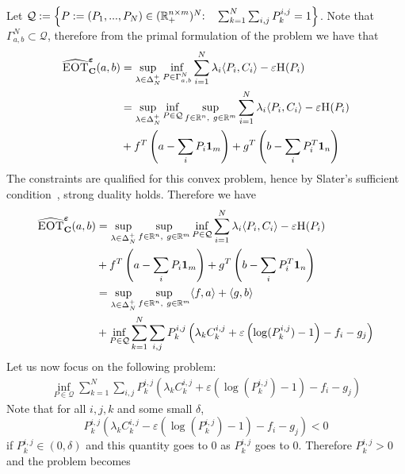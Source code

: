 \begin{prv*}
Let $\mathcal{Q}:=\left\{P:=(P_1,...,P_N)\in(\mathbb{R}_{+}^{n\times m})^N \text{:\quad} \sum_{k=1}^N \sum_{i,j} P_k^{i,j}=1 \right\}$. Note that $\Gamma_{a,b}^N\subset \mathcal{Q}$, therefore from the primal formulation of the problem we have that 
\begin{align*}
    \widehat{\textsc{EOT}}^{\bm{\varepsilon}}_{\mathbf{C}}(a,b)&=\sup_{\lambda\in\Delta_N^{+}}\inf_{P\in \Gamma_{a,b}^N}  \sum_{i=1}^N \lambda_i \langle P_i,C_i\rangle -\varepsilon \textsc{H}(P_i) \\
   &= \sup_{\lambda\in\Delta_N^{+}} \inf_{P\in\mathcal{Q}}  \sup_{f\in\mathbb{R}^n,~g\in\mathbb{R}^m} \sum_{i=1}^N \lambda_i \langle P_i,C_i\rangle -\varepsilon \textsc{H}(P_i)\\
   & +f^T\left(a-\sum_i P_i\mathbf{1}_m\right)+g^T\left(b-\sum_i P_i^T\mathbf{1}_n\right)\\
\end{align*}
The constraints are qualified for this convex problem, hence by Slater's sufficient condition~\citep[Section 5.2.3]{boyd2004convex}, strong duality holds. Therefore we have
\begin{align*}
    \widehat{\textsc{EOT}}^{\bm{\varepsilon}}_{\mathbf{C}}(a,b)&=\sup_{\lambda\in\Delta_N^{+}}\sup_{f\in\mathbb{R}^n,~g\in\mathbb{R}^m} \inf_{P\in \mathcal{Q}} \sum_{i=1}^N \lambda_i \langle P_i,C_i\rangle -\varepsilon \textsc{H}(P_i) \\
    &+ f^T\left(a-\sum_i P_i\mathbf{1}_m\right)+g^T\left(b-\sum_i P_i^T\mathbf{1}_n\right)\\
   &= \sup_{\lambda\in\Delta_N^{+}} \sup_{f\in\mathbb{R}^n,~g\in\mathbb{R}^m} \langle f,a \rangle + \langle g, b \rangle \\
   &+ \inf_{P\in\mathcal{Q}}
   \sum_{k=1}^N \sum_{i,j} P_k^{i,j} \left(\lambda_k C_k^{i,j} +\varepsilon\left(\log(P_k^{i,j})-1\right) -f_i - g_j \right)  \\
\end{align*}
Let us now focus on the following problem:
\begin{align*}
\inf_{P\in\mathcal{Q}}
   \sum_{k=1}^N \sum_{i,j} P_k^{i,j} \left(\lambda_k C_k^{i,j} +\varepsilon\left(\log(P_k^{i,j})-1\right) -f_i - g_j \right)
\end{align*}
Note that for all $i, j,k$ and some small $\delta$,
$$ P_k^{i,j}\left(\lambda_k C_k^{i,j} -\varepsilon\left(\log(P_k^{i,j})-1\right) -f_i - g_j \right)<0$$
if $P_k^{i,j}\in(0,\delta)$ and this quantity goes to 0 as $P_k^{i,j}$ goes to 0. Therefore $P_k^{i,j}>0$ and the problem becomes

\end{prv*}
